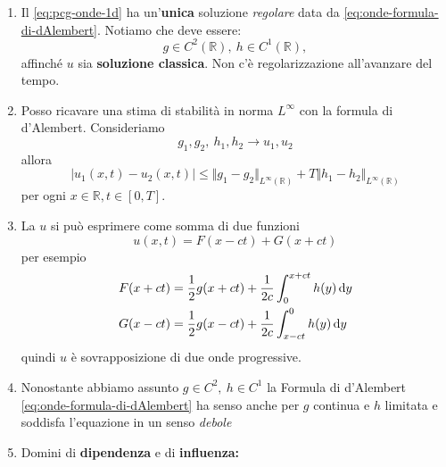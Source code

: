 \begin{enumerate}
    \item Il \eqref{eq:pcg-onde-1d} ha un'\textbf{unica} soluzione \textit{regolare} data da \eqref{eq:onde-formula-di-dAlembert}. Notiamo che deve essere:
          \begin{equation*}
              g\in C^{2}(\mathbb{R}) ,\ h\in C^{1}(\mathbb{R}) ,
          \end{equation*}
          affinché $u$ sia\textbf{ soluzione classica}. Non c'è regolarizzazione all'avanzare del tempo.
    \item Posso ricavare una stima di stabilità in norma $\displaystyle L^{\infty }$ con la formula di d'Alembert. Consideriamo
          \begin{equation*}
              g_{1} ,g_{2} ,\ h_{1} ,h_{2}\rightarrow u_{1} ,u_{2}
          \end{equation*}
          allora
          \begin{equation*}
              | u_{1}(x,t) -u_{2}(x,t)| \leq \Vert g_{1} -g_{2}\Vert _{L^{\infty }(\mathbb{R})} +T\Vert h_{1} -h_{2}\Vert _{L^{\infty }(\mathbb{R})}
          \end{equation*}
          per ogni $x\in \mathbb{R}, t\in [0,T]$.
    \item La $u$ si può esprimere come somma di due funzioni
          \begin{equation*}
              u(x,t) =F(x-ct) +G(x+ct)
          \end{equation*}
          per esempio
          \begin{align*}
              F(x+ct) & =\frac{1}{2} g(x+ct) +\frac{1}{2c}\int _{0}^{x+ct} h(y) \,\mathrm d y \\
              G(x-ct) & =\frac{1}{2} g(x-ct) +\frac{1}{2c}\int _{x-ct}^{0} h(y) \,\mathrm d y
          \end{align*}
          quindi $u$ è sovrapposizione di due onde progressive.
    \item Nonostante abbiamo assunto $\displaystyle g\in C^{2} ,\ h\in C^{1}$ la Formula di d'Alembert \eqref{eq:onde-formula-di-dAlembert} ha senso anche per $g$ continua e $h$ limitata e soddisfa l'equazione in un senso \textit{debole}

    \item Domini di \textbf{dipendenza} e di \textbf{influenza:}



\end{enumerate}
